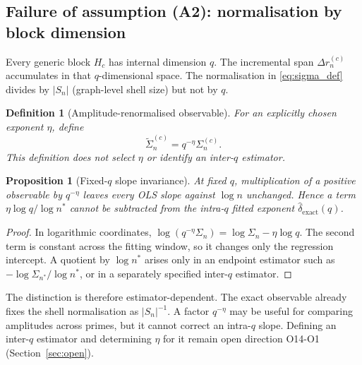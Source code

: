 \documentclass[11pt]{article}
\newtheorem{proposition}[theorem]{Proposition}
\newtheorem{definition}{Definition}
\begin{document}
  \subsection{Failure of assumption (A2): normalisation by block dimension}
    \label{sec:a2}

    Every generic block $H_c$ has internal dimension $q$.
    The incremental span $\Delta r_n^{(c)}$ accumulates in that $q$-dimensional space.
    The normalisation in \eqref{eq:sigma_def} divides by $|S_n|$ (graph-level shell size) but not
    by $q$.

    \begin{definition}[Amplitude-renormalised observable]
      \label{def:block_normalised}
      For an explicitly chosen exponent $\eta$, define
      \begin{equation}
        \label{eq:sigma_norm}
        \widetilde\Sigma_n^{(c)}=q^{-\eta}\Sigma_n^{(c)}.
      \end{equation}
      This definition does not select $\eta$ or identify an inter-$q$ estimator.
    \end{definition}

    \begin{proposition}[Fixed-$q$ slope invariance]
      \label{prop:fixed_q_invariance}
      At fixed $q$, multiplication of a positive observable by $q^{-\eta}$ leaves every OLS slope
      against $\log n$ unchanged.
      Hence a term $\eta\log q/\log n^{*}$ cannot be subtracted from the intra-$q$ fitted exponent
      $\hat\delta_{\mathrm{exact}}(q)$.
    \end{proposition}

    \begin{proof}
      In logarithmic coordinates,
      $\log(q^{-\eta}\Sigma_n) = \log\Sigma_n-\eta\log q$.
      The second term is constant across the fitting window, so it changes only the regression
      intercept.
      A quotient by $\log n^{*}$ arises only in an endpoint estimator such as
      $-\log\Sigma_{n^{*}}/\log n^{*}$, or in a separately specified inter-$q$ estimator.
    \end{proof}

    The distinction is therefore estimator-dependent.
    The exact observable already fixes the shell normalisation as $|S_n|^{-1}$.
    A factor $q^{-\eta}$ may be useful for comparing amplitudes across primes, but it cannot
    correct an intra-$q$ slope.
    Defining an inter-$q$ estimator and determining $\eta$ for it remain open direction O14-O1
    (Section~\ref{sec:open}).
\end{document}
